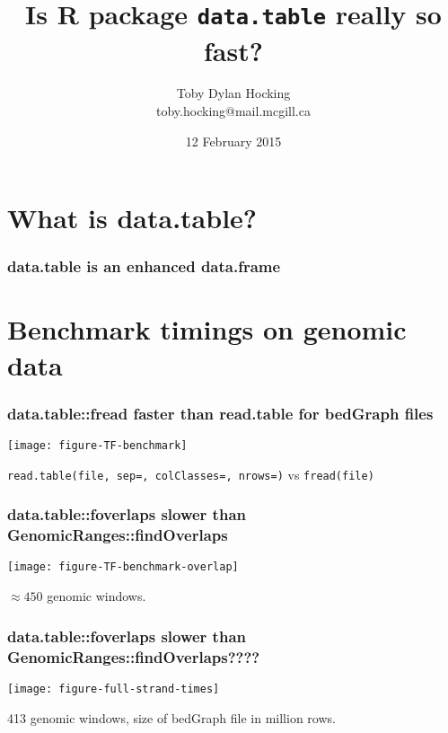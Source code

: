 \documentclass{beamer}
\begin{document}
\title{Is R package \texttt{data.table} really so fast?} 

\author{
  Toby Dylan Hocking\\
  toby.hocking@mail.mcgill.ca}

\date{12 February 2015}

\maketitle

\section{What is data.table?}

\begin{frame}
  \frametitle{data.table is an enhanced data.frame}
\end{frame}

\section{Benchmark timings on genomic data}

\begin{frame}
  \frametitle{data.table::fread faster than read.table for bedGraph
    files}
  \texttt{[image: figure-TF-benchmark]}

  \texttt{read.table(file, sep=, colClasses=, nrows=)} vs
  \texttt{fread(file)}
\end{frame}

\begin{frame}
  \frametitle{data.table::foverlaps slower than
    GenomicRanges::findOverlaps}
  \texttt{[image: figure-TF-benchmark-overlap]}

  $\approx 450$ genomic windows.
\end{frame}

\begin{frame}
  \frametitle{data.table::foverlaps slower than
    GenomicRanges::findOverlaps????}
  \texttt{[image: figure-full-strand-times]}

  413 genomic windows, size of bedGraph file in million rows.

\end{frame}
\end{document}
